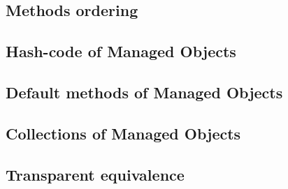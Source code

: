 \subsection{Methods ordering}\label{Methods ordering}

\subsection{Hash-code of Managed Objects}\label{Hashcode of Managed Objects}

\subsection{Default methods of Managed Objects}\label{Default methods of Managed Objects}

\subsection{Collections of Managed Objects}\label{Collections of Managed Objects}

\subsection{Transparent equivalence}\label{Transparent equivalence}
